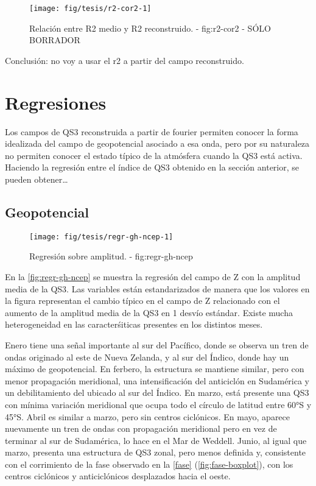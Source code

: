 \documentclass[spanish,a4paper]{book}
\begin{document}
\begin{figure*}
\texttt{[image: fig/tesis/r2-cor2-1]} \caption{Relación entre R2 medio y R2 reconstruido. - fig:r2-cor2 - SÓLO BORRADOR}\label{fig:r2-cor2}
\end{figure*}

Conclusión: no voy a usar el r2 a partir del campo reconstruido.

\section{Regresiones}\label{regresiones}

Los campos de QS3 reconstruida a partir de fourier permiten conocer la
forma idealizada del campo de geopotencial asociado a esa onda, pero por
su naturaleza no permiten conocer el estado típico de la atmósfera
cuando la QS3 está activa. Haciendo la regresión entre el índice de QS3
obtenido en la sección anterior, se pueden
obtener\ldots{}

\subsection{Geopotencial}\label{geopotencial}

\begin{landscape}\begin{figure}

{\centering \texttt{[image: fig/tesis/regr-gh-ncep-1]} 

}

\caption{Regresión sobre amplitud. - fig:regr-gh-ncep}\label{fig:regr-gh-ncep}
\end{figure}
\end{landscape}

En la \autoref{fig:regr-gh-ncep} se muestra la regresión del campo de Z
con la amplitud media de la QS3. Las variables están estandarizados de
manera que los valores en la figura representan el cambio típico en el
campo de Z relacionado con el aumento de la amplitud media de la QS3 en
1 desvío estándar. Existe mucha heterogeneidad en las caracterśiticas
presentes en los distintos meses.

Enero tiene una señal importante al sur del Pacífico, donde se observa
un tren de ondas originado al este de Nueva Zelanda, y al sur del
Índico, donde hay un máximo de geopotencial. En ferbero, la estructura
se mantiene similar, pero con menor propagación meridional, una
intensificación del anticiclón en Sudamérica y un debilitamiento del
ubicado al sur del Índico. En marzo, está presente una QS3 con mínima
variación meridional que ocupa todo el círculo de latitud entre 60°S y
45°S. Abril es similar a marzo, pero sin centros ciclónicos. En mayo,
aparece nuevamente un tren de ondas con propagación meridional pero en
vez de terminar al sur de Sudamérica, lo hace en el Mar de Weddell.
Junio, al igual que marzo, presenta una estructura de QS3 zonal, pero
menos definida y, consistente con el corrimiento de la fase observado en
la \autoref{fase} (\autoref{fig:fase-boxplot}), con los centros
ciclónicos y anticiclónicos desplazados hacia el oeste.
\end{document}
